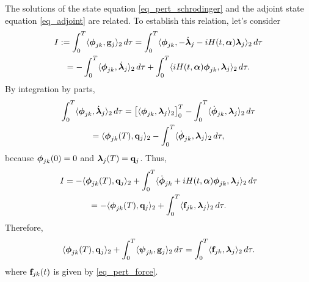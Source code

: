\documentclass[11pt]{article}
\begin{document}
The solutions of the state equation \eqref{eq_pert_schrodinger} and the adjoint state equation
\eqref{eq_adjoint} are related. To establish this relation, let's consider
\begin{multline}
  I:= \int_0^T \langle \boldsymbol{\phi}_{jk}, {\mathbf g}_j \rangle_2\, d\tau =  \int_0^T \langle \boldsymbol{\phi}_{jk},
  -\dot{\boldsymbol{\lambda}}_j - iH(t,\boldsymbol{\alpha})\boldsymbol{\lambda}_j \rangle_2\, d\tau \\
  =  -\int_0^T \langle  \boldsymbol{\phi}_{jk},
  \dot{\boldsymbol{\lambda}}_{j} \rangle_2\, d\tau +  \int_0^T \langle iH(t,\boldsymbol{\alpha}) \boldsymbol{\phi}_{jk},\boldsymbol{\lambda}_j \rangle_2\, d\tau.
\end{multline}
By integration by parts,
\begin{multline*}
\int_0^T \langle  \phib_{jk}, \dot{\lambdab}_{j} \rangle_2\, d\tau =
%
\left[ \langle \phib_{jk}, \lambdab_j \rangle_2 \right]_0^T - \int_0^T \langle  \dot{\phib}_{jk},
\lambdab_{j} \rangle_2\, d\tau\\
%
= \langle \phib_{jk}(T), \qb_j \rangle_2  - \int_0^T \langle  \dot{\phib}_{jk}, \lambdab_{j} \rangle_2\, d\tau,
\end{multline*}
because $\boldsymbol{\phi}_{jk}(0)=0$ and $\boldsymbol{\lambda}_j(T) = {\mathbf q}_j$. Thus,
\begin{multline*}
I = -\langle \phib_{jk}(T), \qb_j \rangle_2 + \int_0^T \langle \dot{\phib}_{jk} + iH(t,\alphab)
\phib_{jk},\lambdab_j \rangle_2\, d\tau\\
%
= -\langle \phib_{jk}(T), \qb_j \rangle_2 + \int_0^T \langle \fb_{jk},\lambdab_j \rangle_2\, d\tau.
\end{multline*}
Therefore,
\begin{equation}\label{eq_adjoint-rel}
 \langle \boldsymbol{\phi}_{jk}(T), {\mathbf q}_j \rangle_2 + \int_0^T \langle \boldsymbol{\psi}_{jk},{\mathbf g}_j\rangle_2\, d\tau = \int_0^T \langle {\mathbf f}_{jk},\boldsymbol{\lambda}_j \rangle_2\, d\tau.
\end{equation}
where ${\mathbf f}_{jk}(t)$ is given by \eqref{eq_pert_force}.
\end{document}
